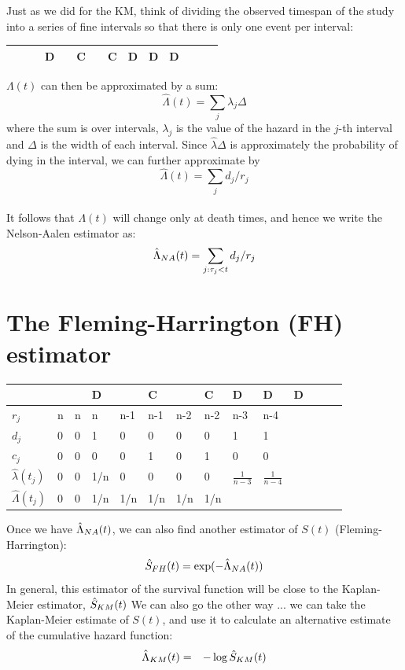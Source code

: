 \documentclass[11pt,slidesonly,semrot,portrait,palatino]{book}
\begin{document}
Just as we did for the KM, think of dividing the observed
timespan of the study into a series of fine intervals so
that there is only one event per interval: \\[2ex]
\begin{center}
\begin{tabular}{l|p{.2in}|p{.2in}|p{.2in}
|p{.2in}|p{.2in}|p{.2in}|p{.2in}|p{.2in}|p{.2in}|p{.2in}
|p{.2in}|p{.2in}|p{.2in}}
&   &  & D & & C & & C & D & D & D \\ \hline
\end{tabular}
\end{center}
$\Lambda(t)$ can then be approximated by a sum:
\[  \hat{\Lambda}(t) = \sum_{j}  \lambda_j  \Delta \]
where the sum is over intervals, $\lambda_j$ is the
value of the hazard in the $j$-th interval and
$\Delta$ is the width of each  interval.  Since $\hat{\lambda} \Delta$
is approximately the probability of dying in the interval, we
can further approximate by
   \[  \hat{\Lambda}(t) = \sum_{j}  d_j/r_j \]\\
It follows that $\Lambda(t)$ will change only at death times,
and hence we write the Nelson-Aalen estimator as:
   \[  \hat{\Lambda}_{\small NA}(t) = \sum_{j: \tau_j<t}  d_j/r_j \]
\section{The Fleming-Harrington (FH) estimator}
\begin{center}
\begin{tabular}{l|p{.2in}|p{.2in}|p{.2in}
 |p{.2in}|p{.3in}|p{.2in}|p{.2in}|p{.2in}|p{.2in}|p{.2in}
 |p{0.2in}|p{.2in}|p{.2in}|}
  &   &  & D & & C & & C &  D & D & D \\ \hline
$r_j$ &  n & n & n & n-1 & n-1& n-2 & n-2 & n-3 & n-4  & \\
$d_j$ &  0 & 0 & 1 & 0   & 0  & 0   & 0   & 1   & 1   & \\
$c_j$ &  0 & 0 & 0 & 0   & 1  & 0   & 1   & 0   & 0   &  \\[2ex]
$\hat{\lambda}(t_j)$ & 0 & 0 & 1/n &  0  &  0  & 0   &  0
& $\frac{1}{n-3}$ &  $\frac{1}{n-4}$  & \\[2ex]
$\hat{\Lambda}(t_j)$ & 0 & 0 & 1/n & 1/n & 1/n & 1/n & 1/n & & &  \\
\end{tabular}
\end{center}
Once we have $\hat{\Lambda}_{\tiny NA}(t)$, we can also find another estimator
of $S(t)$ (Fleming-Harrington):
     \[  \hat{S}_{\tiny FH}(t) = \exp(-\hat{\Lambda}_{\tiny NA}(t)) \]
In general, this estimator of the survival function will be close to
the Kaplan-Meier estimator, $\hat{S}_{\tiny KM}(t)$
We can also go the other way ... we can take the Kaplan-Meier estimate
of $S(t)$, and use it to calculate an alternative estimate of the
cumulative hazard function:
\begin{eqnarray*}
\hat\Lambda_{\tiny KM}(t) & = & - \log \hat{S}_{\tiny KM}(t)
\end{eqnarray*}
\end{document}
